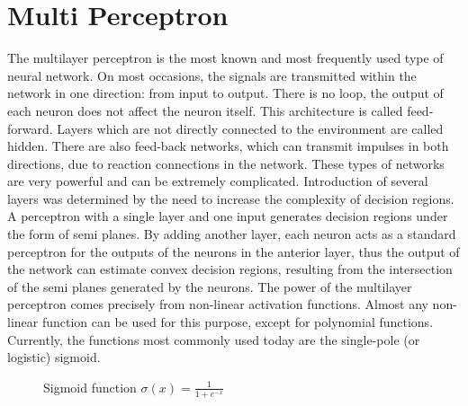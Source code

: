 \section{Multi Perceptron}
The multilayer perceptron is the most known and 
most frequently used type of neural network. On 
most occasions, the signals are transmitted within the 
network in one direction: from input to output. There 
is no loop, the output of each neuron does not affect 
the neuron itself. This architecture is called feed-
forward.
Layers which are not directly connected to the 
environment are called hidden. There are also 
feed-back networks, which can transmit impulses in 
both directions, due to reaction connections in the 
network. These types of networks are very powerful 
and can be extremely complicated. Introduction of several layers was 
determined by the need to increase the complexity of 
decision regions. A perceptron with a single layer and one 
input generates decision regions under the form of 
semi planes. By adding another layer, each neuron 
acts as a standard perceptron for the outputs of the 
neurons in the anterior layer, thus the output of the 
network can estimate convex decision regions, 
resulting from the intersection of the semi planes 
generated by the neurons.
The power of the multilayer perceptron comes 
precisely from non-linear activation functions. 
Almost any non-linear function can be used for this 
purpose, except for polynomial functions. Currently, 
the functions most commonly used today are the 
single-pole (or logistic) sigmoid.

\begin{figure}[H]
    \centering
    \caption{Sigmoid function $\sigma(x) = \frac{1}{1+e^{-x}}$}
    \label{fig:sigmoid}
\end{figure}

